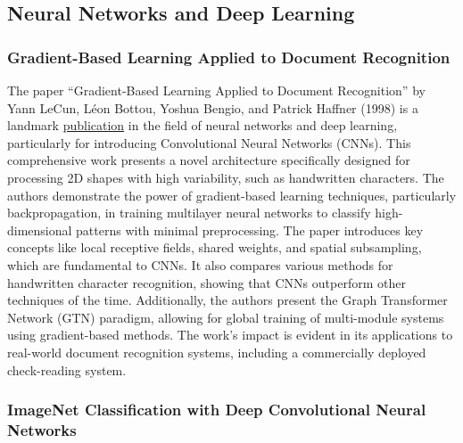 \documentclass{article}
\begin{document}
\subsection{Neural Networks and Deep Learning}

\subsubsection*{Gradient-Based Learning Applied to Document Recognition}

The paper ``Gradient-Based Learning Applied to Document Recognition'' by Yann LeCun, Léon Bottou, Yoshua Bengio, and Patrick Haffner (1998) is a landmark \href{https://ieeexplore.ieee.org/document/726791}{publication} in the field of neural networks and deep learning, particularly for introducing Convolutional Neural Networks (CNNs).\cite{Lecun1998} This comprehensive work presents a novel architecture specifically designed for processing 2D shapes with high variability, such as handwritten characters. The authors demonstrate the power of gradient-based learning techniques, particularly backpropagation, in training multilayer neural networks to classify high-dimensional patterns with minimal preprocessing. The paper introduces key concepts like local receptive fields, shared weights, and spatial subsampling, which are fundamental to CNNs. It also compares various methods for handwritten character recognition, showing that CNNs outperform other techniques of the time. Additionally, the authors present the Graph Transformer Network (GTN) paradigm, allowing for global training of multi-module systems using gradient-based methods. The work's impact is evident in its applications to real-world document recognition systems, including a commercially deployed check-reading system.

\subsubsection*{ImageNet Classification with Deep Convolutional Neural Networks}
\end{document}
